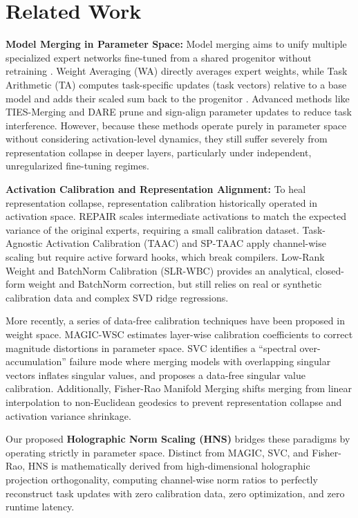 \documentclass{article}
\theoremstyle{plain}
\theoremstyle{definition}
\theoremstyle{remark}
\begin{document}
\section{Related Work}
\label{sec:related}

\textbf{Model Merging in Parameter Space:} Model merging aims to unify multiple specialized expert networks fine-tuned from a shared progenitor without retraining \cite{wortsman22}. Weight Averaging (WA) directly averages expert weights, while Task Arithmetic (TA) computes task-specific updates (task vectors) relative to a base model and adds their scaled sum back to the progenitor \cite{ilharco23}. Advanced methods like TIES-Merging \cite{yadav23} and DARE \cite{yu23} prune and sign-align parameter updates to reduce task interference. However, because these methods operate purely in parameter space without considering activation-level dynamics, they still suffer severely from representation collapse in deeper layers, particularly under independent, unregularized fine-tuning regimes.

\textbf{Activation Calibration and Representation Alignment:} To heal representation collapse, representation calibration historically operated in activation space. REPAIR \cite{jordan23} scales intermediate activations to match the expected variance of the original experts, requiring a small calibration dataset. Task-Agnostic Activation Calibration (TAAC) and SP-TAAC \cite{sptaac24} apply channel-wise scaling but require active forward hooks, which break compilers. Low-Rank Weight and BatchNorm Calibration (SLR-WBC) \cite{yadav24slr} provides an analytical, closed-form weight and BatchNorm correction, but still relies on real or synthetic calibration data and complex SVD ridge regressions. 

More recently, a series of data-free calibration techniques have been proposed in weight space. MAGIC-WSC \cite{magic25} estimates layer-wise calibration coefficients to correct magnitude distortions in parameter space. SVC \cite{svc26} identifies a ``spectral over-accumulation'' failure mode where merging models with overlapping singular vectors inflates singular values, and proposes a data-free singular value calibration. Additionally, Fisher-Rao Manifold Merging \cite{fisherrao26} shifts merging from linear interpolation to non-Euclidean geodesics to prevent representation collapse and activation variance shrinkage.

Our proposed \textbf{Holographic Norm Scaling (HNS)} bridges these paradigms by operating strictly in parameter space. Distinct from MAGIC, SVC, and Fisher-Rao, HNS is mathematically derived from high-dimensional holographic projection orthogonality, computing channel-wise norm ratios to perfectly reconstruct task updates with zero calibration data, zero optimization, and zero runtime latency.
\end{document}
